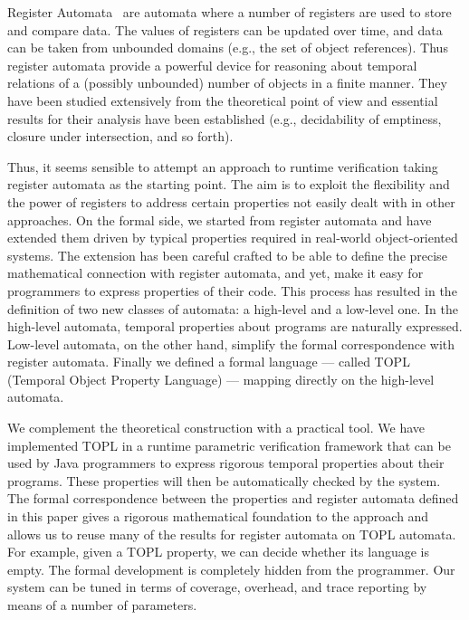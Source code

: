 \documentclass[9pt, preprint]{sigplanconf} %
\theoremstyle{definition}
\theoremstyle{remark}
\begin{document}
Register Automata~\cite{dblp:conf/focs/kaminskif90} are automata where
a number of registers are used to store and compare data. The values
of registers can be updated over time, and data can be taken from unbounded domains (e.g., the set of object references). Thus register automata provide a powerful device for reasoning about temporal 
relations of a (possibly unbounded) number of objects in a finite manner. They have been studied extensively from the theoretical point of
view and essential results for their analysis have been established (e.g., decidability of emptiness, closure under intersection, and so forth).

Thus, it seems sensible to attempt an approach to runtime verification
taking register automata as the starting point. The aim is to
exploit the flexibility and the power of registers to
address certain properties not easily dealt with in other approaches.
On the formal side, we started from register automata and have extended them driven by typical properties required in real-world object-oriented systems.
The extension has been careful crafted to be able to define the precise mathematical connection with register automata, and yet,
make it easy for programmers to express properties of their code. This process has resulted in the definition of two new classes of 
automata: a high-level and a low-level one. In the high-level automata, temporal properties about programs are naturally expressed. Low-level automata, 
on the other hand, simplify the formal correspondence with  register automata. 
Finally we defined a formal language --- called TOPL (Temporal Object Property Language) --- mapping directly on the 
high-level automata.

We complement the theoretical construction with a practical tool.
We have implemented TOPL  in a runtime parametric verification framework that can be used by Java programmers to express rigorous temporal 
properties about their programs. These properties will then be automatically checked by the system.
The formal correspondence between the properties and register automata
defined in this paper gives a rigorous mathematical foundation to
the approach and allows us to reuse many of the results for register automata on TOPL automata. For example, given a TOPL property, we can decide whether its language is empty.  The formal development is completely hidden from 
the programmer.  
Our system can be tuned  in terms of coverage,  overhead, and trace reporting by means of a number of parameters. 
\end{document}
